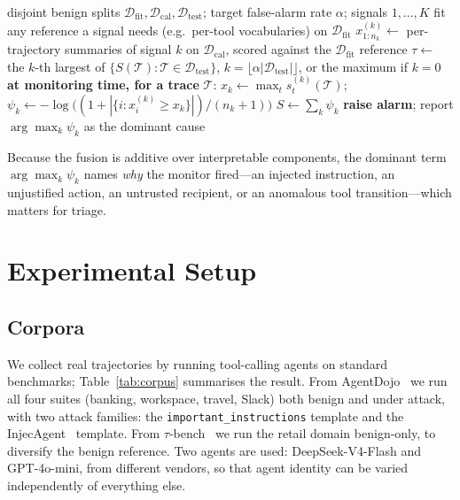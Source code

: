 \documentclass[preprint,12pt,number]{elsarticle}
\theoremstyle{definition}
\newcommand{\Tcal}{\mathcal{T}}
\newcommand{\Dcal}{\mathcal{D}}
\begin{document}
\begin{algorithm}[t]
\caption{SENTRY-Fuse}\label{alg:fuse}
\begin{algorithmic}[1]
\Require disjoint benign splits $\Dcal_{\mathrm{fit}}, \Dcal_{\mathrm{cal}}, \Dcal_{\mathrm{test}}$; target false-alarm rate $\alpha$; signals $1,\dots,K$
\State fit any reference a signal needs (e.g.\ per-tool vocabularies) on $\Dcal_{\mathrm{fit}}$
  \State $x^{(k)}_{1:n_k} \gets$ per-trajectory summaries of signal $k$ on $\Dcal_{\mathrm{cal}}$, scored against the $\Dcal_{\mathrm{fit}}$ reference
\EndFor
\State $\tau \gets$ the $k$-th largest of $\{S(\Tcal) : \Tcal \in \Dcal_{\mathrm{test}}\}$, $k = \lfloor \alpha |\Dcal_{\mathrm{test}}| \rfloor$, or the maximum if $k=0$ 
\Statex \textbf{at monitoring time, for a trace} $\Tcal$:
  \State $x_k \gets \max_t s^{(k)}_t(\Tcal)$;\quad
         $\psi_k \gets -\log\big((1 + |\{i : x^{(k)}_i \ge x_k\}|)/(n_k+1)\big)$
\EndFor
\State $S \gets \sum_k \psi_k$
 \textbf{raise alarm}; report $\arg\max_k \psi_k$ as the dominant cause
\EndIf
\end{algorithmic}
\end{algorithm}

Because the fusion is additive over interpretable components, the dominant term
$\arg\max_k \psi_k$ names \emph{why} the monitor fired---an injected instruction,
an unjustified action, an untrusted recipient, or an anomalous tool
transition---which matters for triage.

\section{Experimental Setup}\label{sec:experiments}

\subsection{Corpora}

We collect real trajectories by running tool-calling agents on standard
benchmarks; Table~\ref{tab:corpus} summarises the result. From
AgentDojo~\citep{debenedetti2024agentdojo} we run all four suites (banking,
workspace, travel, Slack) both benign and under attack, with two attack
families: the \texttt{important\_\hspace{0pt}instructions} template and the
InjecAgent~\citep{zhan2024injecagent} template. From
$\tau$-bench~\citep{yao2024taubench} we run the retail domain benign-only, to
diversify the benign reference. Two agents are used: DeepSeek-V4-Flash and
GPT-4o-mini, from different vendors, so that agent identity can be varied
independently of everything else.
\end{document}
